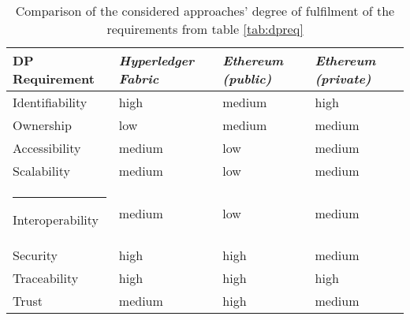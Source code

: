 \begin{table}[H]
    \centering
\caption{Comparison of the considered approaches' degree of fulfilment of the requirements from table \ref{tab:dpreq}}
    \label{tab:cacomparison}
\begin{tabular}{|m{3.3cm}||m{3.8cm}||m{3.6cm}|m{3.6cm}|}
\hline
\rule{0pt}{4ex}\cellcolor{gray!15}\textbf{DP Requirement} & \rule{0pt}{4ex}\cellcolor{gray!15} \textit{\textbf{Hyperledger Fabric}} & \rule{0pt}{4ex}\cellcolor{gray!15} \textit{\textbf{Ethereum (public)}} & \rule{0pt}{4ex}\cellcolor{gray!15} \textit{\textbf{Ethereum (private)}}\\ [12pt]\hline\hline
\rule{0pt}{4ex} Identifiability & \rule{0pt}{4ex}\hspace{48pt}high & \rule{0pt}{4ex}\hspace{38pt}medium & \rule{0pt}{4ex}\hspace{48pt}high\\ [12pt]\hline
\rule{0pt}{4ex} Ownership & \rule{0pt}{4ex}\hspace{50pt}low & \rule{0pt}{4ex}\hspace{38pt}medium & \rule{0pt}{4ex}\hspace{38pt}medium \\ [12pt]\hline
\rule{0pt}{4ex} Accessibility & \rule{0pt}{4ex}\hspace{38pt}medium & \rule{0pt}{4ex}\hspace{50pt}low & \rule{0pt}{4ex}\hspace{38pt}medium \\ [12pt]\hline\hline

\rule{0pt}{4ex} Scalability & \rule{0pt}{4ex}\hspace{38pt}medium & \rule{0pt}{4ex}\hspace{50pt}low & \rule{0pt}{4ex}\hspace{38pt}medium \\ [12pt]\hline
\rule{-2pt}{4ex} Interoperability & \rule{0pt}{4ex}\hspace{38pt}medium & \rule{0pt}{4ex}\hspace{50pt}low & \rule{0pt}{4ex}\hspace{38pt}medium \\ [12pt]\hline
\rule{0pt}{4ex} Security & \rule{0pt}{4ex}\hspace{48pt}high & \rule{0pt}{4ex}\hspace{48pt}high & \rule{0pt}{4ex}\hspace{38pt}medium \\ [12pt]\hline
\rule{0pt}{4ex} Traceability & \rule{0pt}{4ex}\hspace{48pt}high & \rule{0pt}{4ex}\hspace{48pt}high & \rule{0pt}{4ex}\hspace{48pt}high\\ [12pt]\hline
\rule{0pt}{4ex} Trust & \rule{0pt}{4ex}\hspace{38pt}medium & \rule{0pt}{4ex}\hspace{48pt}high & \rule{0pt}{4ex}\hspace{38pt}medium\\ [12pt]\hline\hline


\end{tabular}
\end{table}
